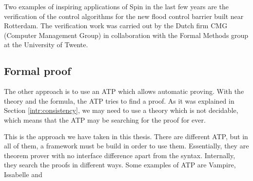 Two examples of inspiring applications of Spin in the last few years are the verification of the control algorithms for the new flood control barrier built near Rotterdam. 
%
The verification work was carried out by the Dutch firm CMG (Computer Management Group) in collaboration with the Formal Methods group at the University of Twente.

\subsection{Formal proof}

The other approach is to use an \gls{ATP} which allows automatic proving. 
%
With the theory and the formula, the \gls{ATP} tries to find a proof. 
%
As it was explained in Section \ref{intr:consistency}, we may need to use a theory which is not decidable,
%
which means that the \gls{ATP} may be searching for the proof for ever.

This is the approach we have taken in this thesis.
%
There are different \gls{ATP}, but in all of them, a framework must be build in order to use them.
%
Essentially, they are theorem prover with no interface difference apart from the syntax. 
%
Internally, they search the proofs in different ways.
%
Some examples of \gls{ATP} are Vampire\cite{vampire}, Issabelle \cite{issabelle} and \spass \cite{spass}

